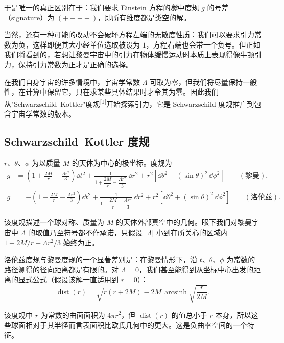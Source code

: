 于是唯一的真正区别在于：我们要求 Einstein 方程的\emph{解}中度规 $g$ 的号差（signature）为 $(++++)$，即所有维度都是类空的解。

当然，还有一种可能的改动不会破坏方程左端的无散度性质：我们可以要求引力常数为负，这样即便其大小经单位选取被设为 $1$，方程右端也会带一个负号。但正如我们将看到的，若想让黎曼宇宙中的引力在物体缓慢运动时本质上表现得像牛顿引力，保持引力常数为正才是正确的选择。

在我们自身宇宙的许多情境中，宇宙学常数 $\Lambda$ 可取为零，但我们将尽量保持一般性，在计算中保留它，只在求某些具体结果时才令其为零。因此我们从"Schwarzschild--Kottler"度规\textsuperscript{[1]}开始探索引力，它是 Schwarzschild 度规推广到包含宇宙学常数的版本。

\subsection*{Schwarzschild--Kottler 度规}

$r$、$\theta$、$\phi$ 为以质量 $M$ 的天体为中心的极坐标。度规为
\begin{align*}
g &= \left(1+\frac{2M}{r}-\frac{\Lambda r^{2}}{3}\right)\dd t^{2}
     +\frac{1}{1+\dfrac{2M}{r}-\dfrac{\Lambda r^{2}}{3}}\,\dd r^{2}
     +r^{2}\left[\dd\theta^{2}+(\sin\theta)^{2}\,\dd\phi^{2}\right]
     \qquad(\text{黎曼}),\\
g &= -\left(1-\frac{2M}{r}-\frac{\Lambda r^{2}}{3}\right)\dd t^{2}
     +\frac{1}{1-\dfrac{2M}{r}-\dfrac{\Lambda r^{2}}{3}}\,\dd r^{2}
     +r^{2}\left[\dd\theta^{2}+(\sin\theta)^{2}\,\dd\phi^{2}\right]
     \qquad(\text{洛伦兹}).
\end{align*}

该度规描述一个球对称、质量为 $M$ 的天体外部真空中的几何。眼下我们对黎曼宇宙中 $\Lambda$ 的取值乃至符号都不作承诺，只假设 $|\Lambda|$ 小到在所关心的区域内 $1+2M/r-\Lambda r^{2}/3$ 始终为正。


洛伦兹度规与黎曼度规的一个显著差别是：在黎曼情形下，沿 $t$、$\theta$、$\phi$ 为常数的路径测得的径向距离都是有限的。对 $\Lambda=0$，我们甚至能得到从坐标中心出发的距离的显式公式（假设该解一直适用到 $r=0$）：
\begin{equation*}
\operatorname{dist}(r)=\sqrt{r(r+2M)}-2M\,\operatorname{arcsinh}\!\sqrt{\frac{r}{2M}}.
\end{equation*}

该度规中 $r$ 为常数的曲面面积为 $4\pi r^{2}$，但 $\operatorname{dist}(r)$ 的值总小于 $r$ 本身，所以这些球面相对于其半径而言表面积比欧氏几何中的更大。这是负曲率空间的一个特征。

